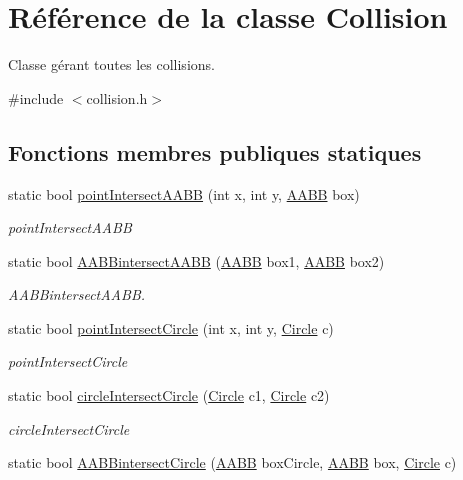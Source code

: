 \hypertarget{class_collision}{\section{Référence de la classe Collision}
\label{class_collision}
}


Classe gérant toutes les collisions.  




{\ttfamily \#include $<$collision.\+h$>$}

\subsection*{Fonctions membres publiques statiques}
\begin{DoxyCompactItemize}
\item 
static bool \hyperlink{class_collision_a01a2ff17f908c50998fa2199b59d48cf}{point\+Intersect\+A\+A\+B\+B} (int x, int y, \hyperlink{struct_a_a_b_b}{A\+A\+B\+B} box)
\begin{DoxyCompactList}\small\item\em point\+Intersect\+A\+A\+B\+B \end{DoxyCompactList}\item 
static bool \hyperlink{class_collision_a1d7e04d1de76331f165e57ffbb1723fc}{A\+A\+B\+Bintersect\+A\+A\+B\+B} (\hyperlink{struct_a_a_b_b}{A\+A\+B\+B} box1, \hyperlink{struct_a_a_b_b}{A\+A\+B\+B} box2)
\begin{DoxyCompactList}\small\item\em A\+A\+B\+Bintersect\+A\+A\+B\+B. \end{DoxyCompactList}\item 
static bool \hyperlink{class_collision_abf0d7915540a1332cb2d067a230ed75d}{point\+Intersect\+Circle} (int x, int y, \hyperlink{struct_circle}{Circle} c)
\begin{DoxyCompactList}\small\item\em point\+Intersect\+Circle \end{DoxyCompactList}\item 
static bool \hyperlink{class_collision_a1648869d14814dda9e7017758275d87c}{circle\+Intersect\+Circle} (\hyperlink{struct_circle}{Circle} c1, \hyperlink{struct_circle}{Circle} c2)
\begin{DoxyCompactList}\small\item\em circle\+Intersect\+Circle \end{DoxyCompactList}\item 
static bool \hyperlink{class_collision_a2991619fe7ba4ce21ef60e5ebbe77bc9}{A\+A\+B\+Bintersect\+Circle} (\hyperlink{struct_a_a_b_b}{A\+A\+B\+B} box\+Circle, \hyperlink{struct_a_a_b_b}{A\+A\+B\+B} box, \hyperlink{struct_circle}{Circle} c)

\end{DoxyCompactItemize}
